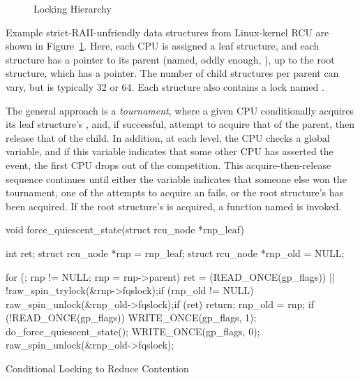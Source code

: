 \begin{figure}[tb]
\centering
{}
\caption{Locking Hierarchy}
\label{fig:locking:Locking Hierarchy}
\end{figure}

Example strict-RAII-unfriendly data structures from Linux-kernel RCU
are shown in
Figure~\ref{fig:locking:Locking Hierarchy}.
Here, each CPU is assigned a leaf  structure, and each
 structure has a pointer to its parent (named, oddly
enough, ), up to the root  structure,
which has a   pointer.
The number of child  structures per parent can vary,
but is typically 32 or 64.
Each  structure also contains a lock named .

The general approach is a \emph{tournament}, where
a given CPU conditionally acquires its
leaf  structure's , and, if successful,
attempt to acquire that of the parent, then release that of the child.
In addition, at each level, the CPU checks a global 
variable, and if this variable indicates that some other CPU has
asserted the event, the first CPU drops out of the competition.
This acquire-then-release sequence continues until either the
 variable indicates that someone else won the tournament,
one of the attempts to acquire an  fails, or
the root  structure's  has been acquired.
If the root  structure's  is acquired,
a function named  is invoked.

\begin{listing}[tbp]
\begin{fcvlabel}
\begin{VerbatimL}[commandchars=\\\[\]]
void force_quiescent_state(struct rcu_node *rnp_leaf)
{
	int ret;
	struct rcu_node *rnp = rnp_leaf;
	struct rcu_node *rnp_old = NULL;

	for (; rnp != NULL; rnp = rnp->parent) {	\lnlbl[loop:b]
		ret = (READ_ONCE(gp_flags)) ||		
		       !raw_spin_trylock(&rnp->fqslock);\lnlbl[trylock]
		if (rnp_old != NULL)			
			raw_spin_unlock(&rnp_old->fqslock);\lnlbl[rel1]
		if (ret)				\lnlbl[giveup]
			return;				\lnlbl[return]
		rnp_old = rnp;				\lnlbl[save]
	}						\lnlbl[loop:e]
	if (!READ_ONCE(gp_flags)) {			
		WRITE_ONCE(gp_flags, 1);		
		do_force_quiescent_state();		\lnlbl[invoke]
		WRITE_ONCE(gp_flags, 0);		
	}
	raw_spin_unlock(&rnp_old->fqslock);		\lnlbl[rel2]
}
\end{VerbatimL}
\end{fcvlabel}
\caption{Conditional Locking to Reduce Contention}
\label{lst:locking:Conditional Locking to Reduce Contention}
\end{listing}

